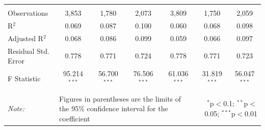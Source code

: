 \documentclass[alpha-refs]{wiley-article-01g}
\begin{document}
\begin{landscape}
\begin{table}[!htbp]
\begin{tabular}{@{\extracolsep{5pt}}lcccccc}
  & & & & & & \\ 
\hline \\[-3ex] 
Observations & 3,853 & 1,780 & 2,073 & 3,809 & 1,750 & 2,059 \\ 
R$^{2}$ & 0.069 & 0.087 & 0.100 & 0.060 & 0.068 & 0.098 \\ 
Adjusted R$^{2}$ & 0.068 & 0.086 & 0.099 & 0.059 & 0.066 & 0.097 \\ 
Residual Std. Error & 0.778 & 0.771 & 0.724 & 0.778 & 0.771 & 0.723 \\ 
F Statistic & 95.214$^{***}$ & 56.700$^{***}$ & 76.506$^{***}$ & 61.036$^{***}$ & 31.819$^{***}$ & 56.047$^{***}$ \\ 
\hline 
\hline \\[-3ex] 
\textit{Note:} &\multicolumn{4}{l}{Figures in parentheses are the limits of the 95\% confidence interval for the coefficient}  & \multicolumn{2}{r}{$^{*}$p$<$0.1; $^{**}$p$<$0.05; $^{***}$p$<$0.01} \\ 
\end{tabular} 
\end{table} 

\end{landscape}

\newpage
\end{document}
